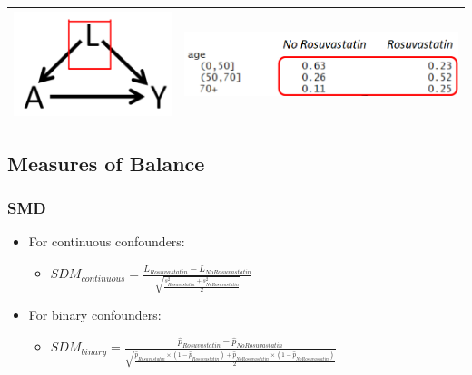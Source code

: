 \documentclass[
]{book}
\providecommand{\tightlist}{%
  \setlength{\itemsep}{0pt}\setlength{\parskip}{0pt}}
\begin{document}
\begin{longtable}[]{@{}ll@{}}
\toprule
\endhead
\includegraphics{images/condRCT.png} & \includegraphics{images/imbalance.png}\tabularnewline
\bottomrule
\end{longtable}

\hypertarget{measures-of-balance}{%
\subsection{Measures of Balance}\label{measures-of-balance}}

\hypertarget{smd}{%
\subsubsection{SMD}\label{smd}}

\citet{austin2011introduction}

\begin{itemize}
\tightlist
\item
  For continuous confounders:

  \begin{itemize}
  \tightlist
  \item
    \(SDM_{continuous} = \frac{\bar{L}_{Rosuvastatin} - \bar{L}_{No Rosuvastatin}}{\sqrt{\frac{s^2_{Rosuvastatin} + s^2_{No Rosuvastatin}}{2}}}\)
  \end{itemize}
\item
  For binary confounders:

  \begin{itemize}
  \tightlist
  \item
    \(SDM_{binary} = \frac{\hat{p}_{Rosuvastatin} - \hat{p}_{No Rosuvastatin}}{\sqrt{\frac{ \hat{p}_{Rosuvastatin} \times (1 - \hat{p}_{Rosuvastatin}) + \hat{p}_{No Rosuvastatin} \times (1 - \hat{p}_{No Rosuvastatin}) }{2}}}\)
  \end{itemize}
\end{itemize}
\end{document}
